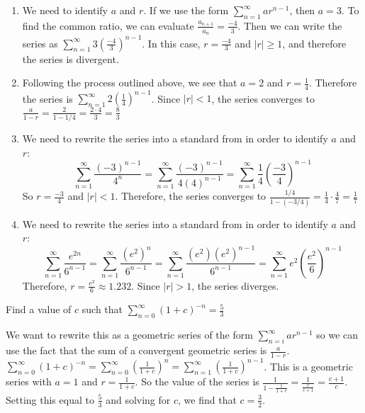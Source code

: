 \begin{Answer}[ref = geo1]
\begin{enumerate}
\item We need to identify $a$ and $r$. If we use the form $\sum_{n=1}^\infty 
ar^{n-1}$, then $a = 3$. To find the common ratio, we can evaluate $\frac{a_
{n+1}}{a_n} = \frac{-4}{3}$. Then we can write the series as $\sum_{n=1}^\infty 
3 \left( \frac{-4}{3} \right)^{n-1}$. In this case, $r = \frac{-4}{3}$ and $|r| 
\geq 1$, and therefore the series is divergent. 
\item Following the process outlined above, we see that $a = 2$ and $r = 
\frac{1}{4}$. Therefore the series is $\sum_{n=1}^\infty 2 \left( \frac{1}{4} 
\right)^{n-1}$. Since $|r| < 1$, the series converges to $\frac{a}{1-r} = 
\frac{2}{1-1/4} = \frac{2 \cdot 4}{3} = \frac{8}{3}$
\item We need to rewrite the series into a standard from in order to identify 
$a$ and $r$:
$$\sum_{n=1}^\infty \frac{(-3)^{n-1}}{4^n} = \sum_{n=1}^\infty \frac{(-3)^
{n-1}}{4(4)^{n-1}} = \sum_{n=1}^\infty \frac{1}{4} \left( \frac{-3}{4} \right)
^{n-1}$$
So $r = \frac{-3}{4}$ and $|r| < 1$. Therefore, the series converges to 
$\frac{1/4}{1 - (-3/4)} = \frac{1}{4} \cdot \frac{4}{7} = \frac{1}{7}$
\item We need to rewrite the series into a standard from in order to identify 
$a$ and $r$:
$$\sum_{n=1}^\infty \frac{e^{2n}}{6^{n-1}} = \sum_{n=1}^\infty \frac{(e^2)^n}
{6^{n-1}} = \sum_{n=1}^\infty \frac{(e^2)(e^2)^{n-1}}{6^{n-1}} = \sum_{n=1}^
\infty e^2 \left( \frac{e^2}{6} \right)^{n-1}$$
Therefore, $r = \frac{e^2}{6} \approx 1.232$. Since $|r| > 1$, the series 
diverges. 
\end{enumerate}
\end{Answer}

\begin{Exercise}[label = geo2]
Find a value of $c$ such that $\sum_{n=0}^\infty (1 + c)^{-n} = \frac{5}{3}$
\end{Exercise}

\begin{Answer}[ref = geo2]
We want to rewrite this as a geometric series of the form $\sum_{n=i}^\infty 
ar^{n-1}$ so we can use the fact that the sum of a convergent geometric series 
is $\frac{a}{1-r}$. $\sum_{n=0}^\infty (1 + c)^{-n} = \sum_{n=0}^\infty \left( 
\frac{1}{1+c} \right)^n = \sum_{n=1}^\infty \left( \frac{1}{1 + c} \right)^
{n-1}$. This is a geometric series with $a = 1$ and $r = \frac{1}{1 + c}$. So 
the value of the series is $\frac{1}{1 - \frac{1}{1+c}} = 
\frac{1}{\frac{c}{c+1}} = \frac{c+1}{c}$. Setting this equal to $\frac{5}{3}$ 
and solving for $c$, we find that $c = \frac{3}{2}$.
\end{Answer}


